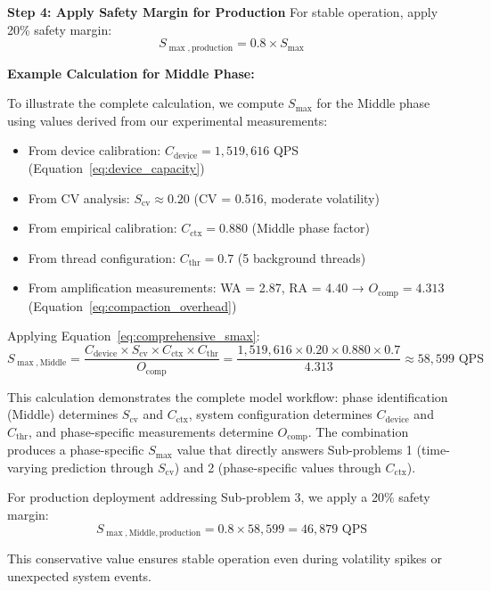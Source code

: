 \documentclass[11pt]{article}
\begin{document}
\textbf{Step 4: Apply Safety Margin for Production}
For stable operation, apply 20\% safety margin:
\begin{equation}
S_{\max,\text{production}} = 0.8 \times S_{\max}
\end{equation}

\textbf{Example Calculation for Middle Phase:}

To illustrate the complete calculation, we compute $S_{\max}$ for the Middle phase using values derived from our experimental measurements:

\begin{itemize}
    \item From device calibration: $C_{\text{device}} = 1,519,616$ QPS (Equation~\ref{eq:device_capacity})
    \item From CV analysis: $S_{\text{cv}} \approx 0.20$ (CV = 0.516, moderate volatility)
    \item From empirical calibration: $C_{\text{ctx}} = 0.880$ (Middle phase factor)
    \item From thread configuration: $C_{\text{thr}} = 0.7$ (5 background threads)
    \item From amplification measurements: WA = 2.87, RA = 4.40 → $O_{\text{comp}} = 4.313$ (Equation~\ref{eq:compaction_overhead})
\end{itemize}

Applying Equation~\ref{eq:comprehensive_smax}:
\[
S_{\max,\text{Middle}} = \frac{C_{\text{device}} \times S_{\text{cv}} \times C_{\text{ctx}} \times C_{\text{thr}}}{O_{\text{comp}}} = \frac{1,519,616 \times 0.20 \times 0.880 \times 0.7}{4.313} \approx 58,599 \text{ QPS}
\]

This calculation demonstrates the complete model workflow: phase identification (Middle) determines $S_{\text{cv}}$ and $C_{\text{ctx}}$, system configuration determines $C_{\text{device}}$ and $C_{\text{thr}}$, and phase-specific measurements determine $O_{\text{comp}}$. The combination produces a phase-specific $S_{\max}$ value that directly answers Sub-problems 1 (time-varying prediction through $S_{\text{cv}}$) and 2 (phase-specific values through $C_{\text{ctx}}$).

For production deployment addressing Sub-problem 3, we apply a 20\% safety margin:
\[
S_{\max,\text{Middle},\text{production}} = 0.8 \times 58,599 = 46,879 \text{ QPS}
\]

This conservative value ensures stable operation even during volatility spikes or unexpected system events.
\end{document}
